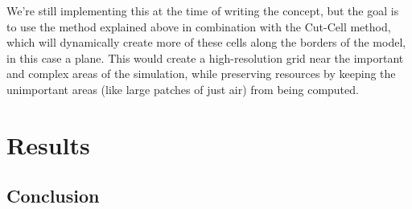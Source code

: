 \documentclass[a4paper,12pt]{article}
\begin{document}
We're still implementing this at the time of writing the concept, but the goal
is to use the method explained above in combination with the Cut-Cell method,
which will dynamically create more of these cells along the borders of the model,
in this case a plane. This would create a high-resolution grid near the important
and complex areas of the simulation, while preserving resources by keeping the
unimportant areas (like large patches of just air) from being computed.

\section{Results}
\ipsum[1]

\subsection{Conclusion}
\ipsum[1]

\nocite{*}
\printbibliography
\end{document}
